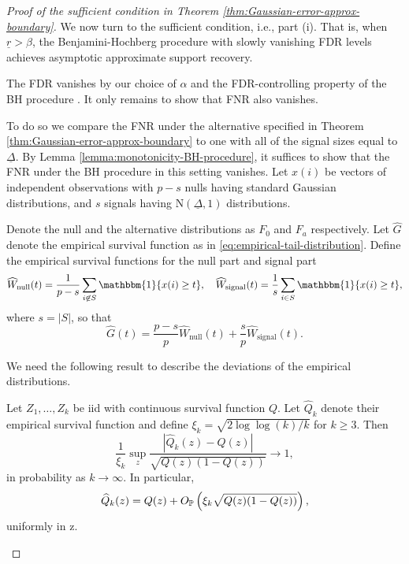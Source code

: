 \begin{proof}[Proof of the sufficient condition in Theorem \ref{thm:Gaussian-error-approx-boundary}]
We now turn to the sufficient condition, i.e., part {\rm (i)}. That is, when $\underline{r} > \beta$, the Benjamini-Hochberg procedure with 
slowly vanishing FDR levels achieves asymptotic approximate support recovery.

The FDR vanishes by our choice of $\alpha$ and the FDR-controlling property of the BH procedure \citep{benjamini1995controlling}.
It only remains to show that FNR also vanishes.

To do so we compare the FNR under the alternative specified in Theorem \ref{thm:Gaussian-error-approx-boundary} to one with all of the signal sizes equal to $\underline{\Delta}$.
By Lemma \ref{lemma:monotonicity-BH-procedure}, it suffices to show that the FNR under the BH procedure in this setting vanishes.
Let $x(i)$ be vectors of independent observations with $p-s$ nulls having standard Gaussian distributions, and $s$ signals having $\mathrm{N}(\underline{\Delta}, 1)$ distributions.

Denote the null and the alternative distributions as $F_0$ and $F_{a}$ respectively.
Let $\widehat{G}$ denote the empirical survival function as in \eqref{eq:empirical-tail-distribution}.
Define the empirical survival functions for the null part and signal part
\begin{equation} \label{eq:empirical-survival-null-signal-Gaussian}
    \widehat{W}_\text{null}(t) = \frac{1}{p-s}\sum_{i\not\in S}\mathbbm{1}\{x(i) \ge t\},
    \quad
    \widehat{W}_\text{signal}(t) = \frac{1}{s}\sum_{i\in S}\mathbbm{1}\{x(i) \ge t\},
\end{equation}
where $s=|S|$, so that
$$
\widehat{G}(t) = \frac{p-s}{p}\widehat{W}_\text{null}(t) + \frac{s}{p}\widehat{W}_\text{signal}(t).
$$

We need the following result to describe the deviations of the empirical distributions.
\begin{lemma} \label{lemma:empirical-process}
Let $Z_1,\ldots,Z_k$ be iid with continuous survival function $Q$.
Let $\widehat{Q}_k$ denote their empirical survival function and define 
$\xi_k = \sqrt{2\log{\log{(k)}}/k}$ for $k \ge 3$. 
Then
$$
\frac{1}{\xi_k}\sup_z\frac{|\widehat{Q}_k(z) - Q(z)|}{\sqrt{Q(z)(1 - Q(z))}} \to 1,
$$
in probability as $k \to \infty$.
In particular,
$$
\widehat{Q}_k(z) = Q(z) + O_\P\left(\xi_k\sqrt{Q(z)(1 - Q(z))}\right),
$$
uniformly in z.
\end{lemma}


\end{proof}
